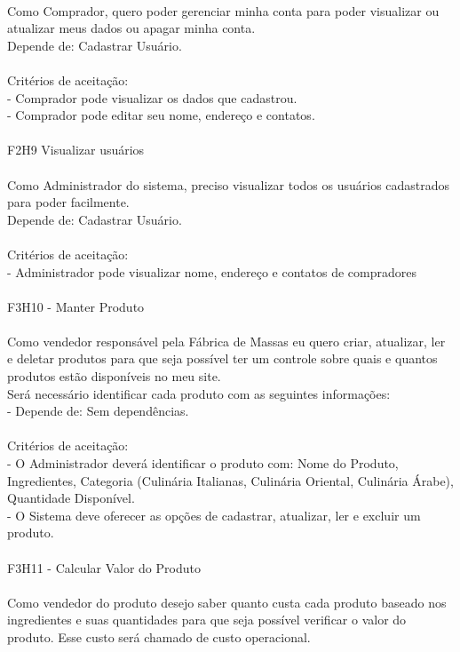 \\
\tab Como Comprador, quero poder gerenciar minha conta para poder visualizar ou atualizar meus dados ou apagar minha conta.\\
\tab Depende de: Cadastrar Usuário.\\
\\
\tab Critérios de aceitação:\\
\tab - Comprador pode visualizar os dados que cadastrou.\\
\tab - Comprador pode editar seu nome, endereço e contatos.\\
\\
\tab F2H9 Visualizar usuários\\
\\
\tab Como Administrador do sistema, preciso visualizar todos os usuários cadastrados para poder facilmente.\\
\tab Depende de: Cadastrar Usuário.\\
\\
\tab Critérios de aceitação:\\
\tab - Administrador pode visualizar nome, endereço e contatos de compradores\\
\\
\tab F3H10 - Manter Produto\\
\\
\tab Como vendedor responsável pela Fábrica de Massas eu quero criar, atualizar, ler e deletar produtos para que seja possível ter um controle sobre quais e quantos produtos estão disponíveis no meu site.\\
\tab Será necessário identificar cada produto com as seguintes informações:\\
\tab - Depende de: Sem dependências.\\
\\
\tab Critérios de aceitação:\\
\tab - O Administrador deverá identificar o produto com: Nome do Produto, Ingredientes, Categoria (Culinária Italianas, Culinária Oriental, Culinária Árabe), Quantidade Disponível.\\
\tab - O Sistema deve oferecer as opções de cadastrar, atualizar, ler e excluir um produto.\\
\\
\tab F3H11 - Calcular Valor do Produto\\
\\
\tab Como vendedor do produto desejo saber quanto custa cada produto baseado nos ingredientes e suas quantidades para que seja possível verificar o valor do produto. Esse custo será chamado de custo operacional.\\
